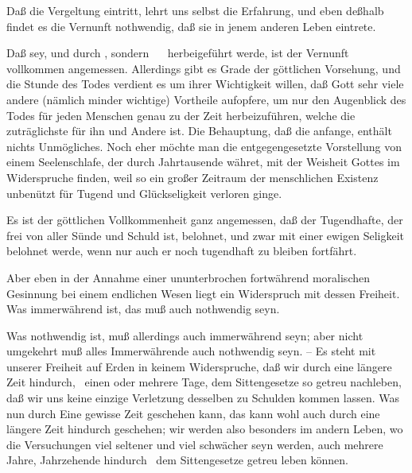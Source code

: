 \begin{aufza}
\item Daß die Vergeltung  eintritt, lehrt uns selbst die Erfahrung, und eben deßhalb findet es die Vernunft nothwendig, daß sie in jenem anderen Leben eintrete.
\item Daß  sey, und durch , sondern ~\  herbeigeführt werde, ist der Vernunft vollkommen angemessen. Allerdings gibt es Grade der göttlichen Vorsehung, und die Stunde des Todes verdient es um ihrer Wichtigkeit willen, daß Gott sehr viele andere (nämlich minder wichtige) Vortheile aufopfere, um nur den Augenblick des Todes für jeden Menschen genau zu der Zeit herbeizuführen, welche die zuträglichste für ihn und Andere ist. Die Behauptung, daß die  anfange, enthält nichts Unmögliches. Noch eher möchte man die entgegengesetzte Vorstellung von einem Seelenschlafe, der durch Jahrtausende währet, mit der Weisheit Gottes im Widerspruche finden, weil so ein großer Zeitraum der menschlichen Existenz unbenützt für Tugend und Glückseligkeit verloren ginge.
\item {}
\begin{aufzb}
\item {} Es ist der göttlichen Vollkommenheit ganz angemessen, daß der Tugendhafte, der frei von aller Sünde und Schuld ist, belohnet, und zwar mit einer ewigen Seligkeit belohnet werde, wenn nur auch er noch tugendhaft zu bleiben fortfährt.
\begin{aufzc}
\item {} Aber eben in der Annahme einer ununterbrochen fortwährend moralischen Gesinnung bei einem endlichen Wesen liegt ein Widerspruch mit dessen Freiheit. Was immerwährend ist, das muß auch nothwendig seyn.\par
{} Was nothwendig ist, muß allerdings auch immerwährend seyn; aber nicht umgekehrt muß alles Immerwährende auch nothwendig seyn. -- Es steht mit unserer Freiheit auf Erden in keinem Widerspruche, daß wir durch eine längere Zeit hindurch, \zB\ einen oder mehrere Tage, dem Sittengesetze so getreu nachleben, daß wir uns keine einzige Verletzung desselben zu Schulden kommen lassen. Was nun durch Eine gewisse Zeit geschehen kann, das kann wohl auch durch eine längere Zeit hindurch geschehen; wir werden also besonders im andern Leben, wo die Versuchungen viel seltener und viel schwächer seyn werden, auch mehrere Jahre, Jahrzehende hindurch \usw\ dem Sittengesetze getreu leben können.~

\end{aufzc}
\end{aufzb}
\end{aufza}
